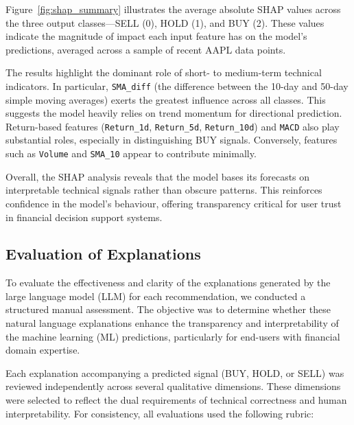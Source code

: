 Figure~\ref{fig:shap_summary} illustrates the average absolute SHAP values across the three output classes—SELL (0), HOLD (1), and BUY (2). These values indicate the magnitude of impact each input feature has on the model's predictions, averaged across a sample of recent AAPL data points.

The results highlight the dominant role of short- to medium-term technical indicators. In particular, \texttt{SMA\_diff} (the difference between the 10-day and 50-day simple moving averages) exerts the greatest influence across all classes. This suggests the model heavily relies on trend momentum for directional prediction. Return-based features (\texttt{Return\_1d}, \texttt{Return\_5d}, \texttt{Return\_10d}) and \texttt{MACD} also play substantial roles, especially in distinguishing BUY signals. Conversely, features such as \texttt{Volume} and \texttt{SMA\_10} appear to contribute minimally.

Overall, the SHAP analysis reveals that the model bases its forecasts on interpretable technical signals rather than obscure patterns. This reinforces confidence in the model's behaviour, offering transparency critical for user trust in financial decision support systems.

\subsection{Evaluation of Explanations}

To evaluate the effectiveness and clarity of the explanations generated by the large language model (LLM) for each recommendation, we conducted a structured manual assessment. The objective was to determine whether these natural language explanations enhance the transparency and interpretability of the machine learning (ML) predictions, particularly for end-users with financial domain expertise.

Each explanation accompanying a predicted signal (BUY, HOLD, or SELL) was reviewed independently across several qualitative dimensions. These dimensions were selected to reflect the dual requirements of technical correctness and human interpretability. For consistency, all evaluations used the following rubric:

